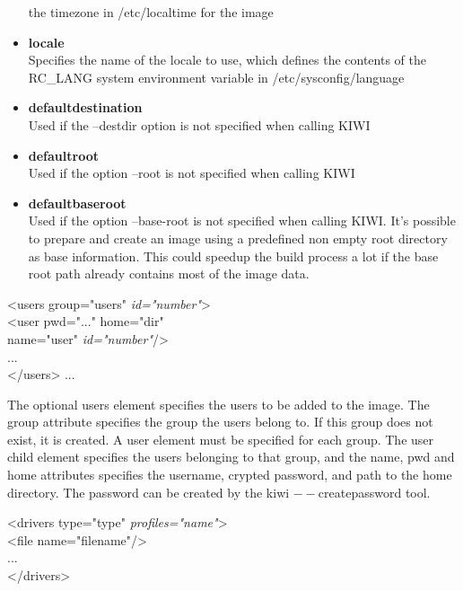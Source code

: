 \begin{itemize}
      the timezone in /etc/localtime for the image
\item \textbf{locale}\\
      Specifies the name of the locale to use, which defines the
      contents of the RC\_LANG system environment variable in
      /etc/sysconfig/language
\item \textbf{defaultdestination}\\
      Used if the --destdir option is not specified when calling KIWI
\item \textbf{defaultroot}\\
      Used if the option --root is not specified when calling KIWI
\item \textbf{defaultbaseroot}\\
      Used if the option --base-root is not specified when
      calling KIWI. It's possible to prepare and create an image using a
      predefined non empty root directory as base information.
      This could speedup the build process a lot if the base root path
      already contains most of the image data.
\end{itemize}

\begin{Command}{12cm}
<users group="users" \textit{id="number"}>\\
\hspace*{1cm}<user pwd="..." home="dir"\\ 
\hspace*{1.5cm}name="user" \textit{id="number"}/>\\
\hspace*{1cm}...\\
</users>
...
\end{Command}

The optional users element specifies the users to be added to the image.
The group attribute specifies the group the users belong to. If this group
does not exist, it is created. A user element must be specified for
each group. The user child element specifies the users belonging to that
group, and the name, pwd and home attributes specifies the username,
crypted password, and path to the home directory. The password can be
created by the kiwi $--$createpassword tool.

\begin{Command}{12cm}
<drivers type="type" \textit{profiles="name"}>\\
\hspace*{1cm}<file name="filename"/>\\
\hspace*{1cm}...\\
</drivers>
\end{Command}

